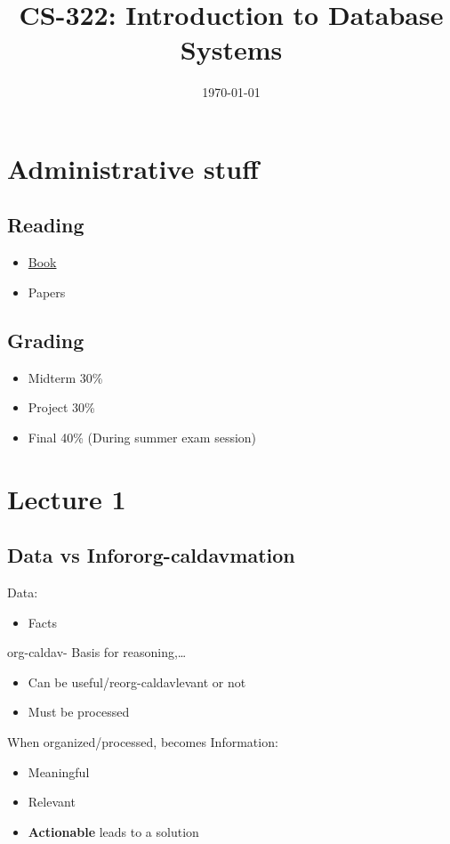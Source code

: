 \documentclass[11pt]{article}
\date{\today}
\title{CS-322: Introduction to Database Systems}
\begin{document}
\maketitle
\setcounter{tocdepth}{2}
\tableofcontents

\section{Administrative stuff}
\label{sec:org9d6bd25}
\subsection{Reading}
\label{sec:org86ddf94}
\begin{itemize}
\item \href{Ramakrishnan\%20-\%20Database\%20Management\%20Systems\%203rd\%20Edition.pdf}{Book}
\item Papers
\end{itemize}
\subsection{Grading}
\label{sec:org3525cb0}
\begin{itemize}
\item Midterm 30\%
\item Project 30\%
\item Final   40\% (During summer exam session)
\end{itemize}
\section{Lecture 1}
\label{sec:org0a91a8e}
\subsection{Data vs Infororg-caldavmation}
\label{sec:org6329b3b}
Data:
\begin{itemize}
\item Facts
\end{itemize}
org-caldav- Basis for reasoning,\ldots{}
\begin{itemize}
\item Can be useful/reorg-caldavlevant or not
\item Must be processed
\end{itemize}
When organized/processed, becomes Information:
\begin{itemize}
\item Meaningful
\item Relevant
\item \textbf{Actionable} leads to a solution
\end{itemize}
\end{document}
